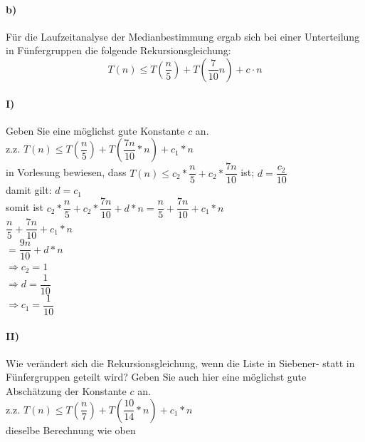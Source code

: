 \documentclass[paper=a4, fontsize=11pt]{scrartcl}
\numberwithin{equation}{section}
\numberwithin{figure}{section}
\numberwithin{table}{section}
\begin{document}
\paragraph{b)}
Für die Laufzeitanalyse der Medianbestimmung ergab sich bei einer Unterteilung in Fünfergruppen die folgende Rekursionsgleichung:
\[
T(n) \leq T
\left(
  \frac{n}{5}
\right) + T
\left(
  \frac{7}{10}n
\right) + c \cdot n
\]

\paragraph{I)}
Geben Sie eine möglichst gute Konstante $c$ an. \\

z.z. $T(n) \leq T(\dfrac{n}{5})+T(\dfrac{7n}{10} *n)+c_{1} * n$ \\

in Vorlesung bewiesen, dass $T(n) \leq c_{2} * \dfrac{n}{5} + c_{2} * \dfrac{7n}{10}$ ist; $d= \dfrac{c_{2}}{10}$ \\

damit gilt: $d=c_{1}$ \\

somit ist $c_{2}* \dfrac{n}{5} + c_{2} * \dfrac{7n}{10} + d*n = \dfrac{n}{5} + \dfrac{7n}{10} + c_{1}*n$ \\

$\dfrac{n}{5} + \dfrac{7n}{10} + c_{1}*n$ \\

$= \dfrac{9n}{10} + d*n$ \\

$\Rightarrow c_{2}=1$ \\

$\Rightarrow d= \dfrac{1}{10}$ \\

$\Rightarrow c_{1} = \dfrac{1}{10}$

\paragraph{II)} 
Wie verändert sich die Rekursionsgleichung, wenn die Liste in Siebener- statt in Fünfergruppen geteilt wird?
Geben Sie auch hier eine möglichst gute Abschätzung der Konstante $c$ an. \\

z.z. $T(n) \leq T(\dfrac{n}{7})+T( \dfrac{10}{14}*n) + c_{1} * n$ \\

dieselbe Berechnung wie oben \\
\end{document}
